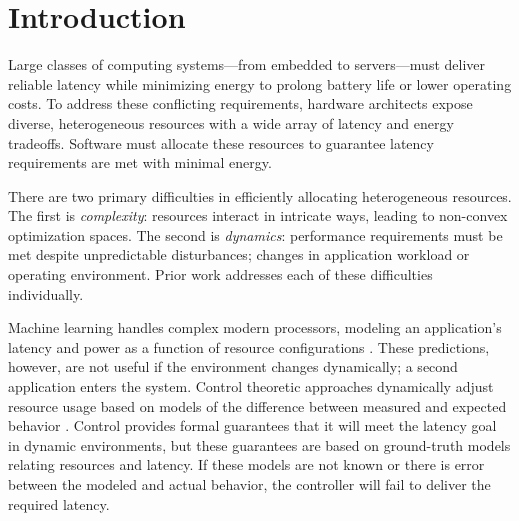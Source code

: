 \section{Introduction}
Large classes of computing systems---from embedded to servers---must
deliver reliable latency while minimizing energy to prolong battery
life or lower operating costs.  To address these conflicting
requirements, hardware architects expose diverse, heterogeneous
resources with a wide array of latency and energy tradeoffs.  Software
must allocate these resources to guarantee latency requirements are
met with minimal energy.


There are two primary difficulties in efficiently allocating
heterogeneous resources.  The first is \emph{complexity}: resources
interact in intricate ways, leading to non-convex optimization spaces.
The second is \emph{dynamics}: perfor\-mance requirements must be met
despite unpredictable disturbances; \eg{} changes in application
workload or operating environment.  Prior work addresses each of these
difficulties individually.

Machine learning handles complex modern processors, modeling an
application's latency and power as a function of resource
configurations
\cite{reddiHPCA2013,dubach2010,Bitirgen2008,Ipek,Koala,LEO,Flicker,Ponamarev,Paragon}.
These predictions, however, are not useful if the environment changes
dynamically; \eg{} a second application enters the system.  Control
theoretic approaches dynamically adjust resource usage based on models
of the difference between measured and expected behavior
\cite{METE,Steere99,grace,Hellerstein2004a,Chen2011,POET,ControlWare,Agilos,grace2,JouleGuard}.
Control provides formal guarantees that it will meet the latency
goal in dynamic environments, but these guarantees are based on
ground-truth models relating resources and latency.  If these
models are not known or there is error between the modeled and actual
behavior, the controller will fail to deliver the required
latency.

